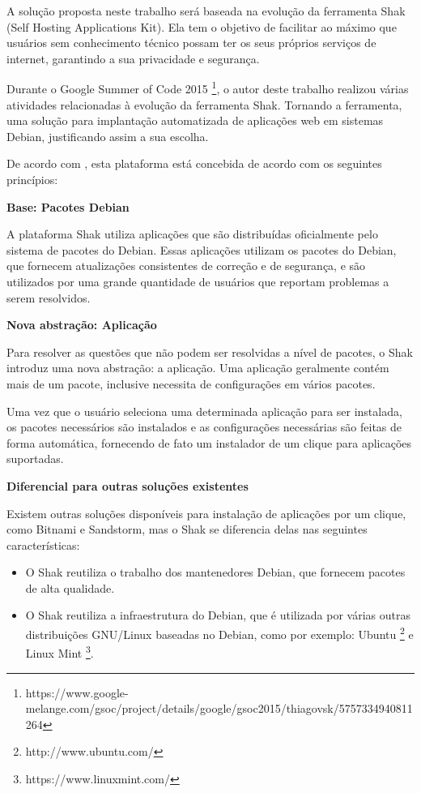 A solução proposta neste trabalho será baseada na evolução da ferramenta Shak
(Self Hosting Applications Kit). Ela tem o objetivo de facilitar 
ao máximo que usuários sem conhecimento técnico possam ter os seus próprios 
serviços de internet, garantindo a sua privacidade e segurança. 

Durante o Google Summer of Code 2015 \footnote{https://www.google-melange.com/gsoc/project/details/google/gsoc2015/thiagovsk/5757334940811264}, o autor deste trabalho realizou 
várias atividades relacionadas à evolução da ferramenta Shak. Tornando a ferramenta, uma
 solução para implantação automatizada de aplicações web em sistemas Debian, 
justificando assim a sua escolha.

De acordo com , esta plataforma está concebida de acordo 
com os seguintes princípios:

\textbf{Base: Pacotes Debian}

A plataforma Shak utiliza aplicações que são distribuídas oficialmente pelo 
sistema de pacotes do Debian. Essas aplicações utilizam os
pacotes do Debian, que fornecem atualizações consistentes de correção e de segurança,
e são utilizados por uma grande quantidade de usuários que reportam problemas a
serem resolvidos. 

\textbf{Nova abstração: Aplicação}

Para resolver as questões que não podem ser resolvidas a nível de pacotes, o
Shak introduz uma nova abstração: a aplicação. Uma aplicação geralmente
contém mais de um pacote, inclusive necessita de configurações em vários pacotes.

Uma vez que o usuário seleciona uma determinada aplicação para
ser instalada, os pacotes necessários são instalados e as configurações
necessárias são feitas de forma automática, fornecendo de fato um instalador
de um clique para aplicações suportadas. 

\textbf{Diferencial para outras soluções existentes}

Existem outras soluções disponíveis para instalação de aplicações por um clique,
como Bitnami e Sandstorm, mas o Shak se
diferencia delas nas seguintes características:

\begin{itemize}

  \item O Shak reutiliza o trabalho dos mantenedores Debian, que fornecem pacotes
    de alta qualidade.

  \item O Shak reutiliza a infraestrutura do Debian, que é utilizada por várias
outras distribuições GNU/Linux baseadas no Debian, como por exemplo: Ubuntu \footnote{http://www.ubuntu.com/} e Linux Mint \footnote{https://www.linuxmint.com/}.

\end{itemize}

